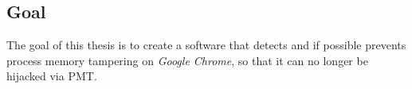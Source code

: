 \subsection{Goal}
The goal of this thesis is to create a software that detects and if possible prevents process memory tampering on \emph{Google Chrome}, so that it can no longer be hijacked via \gls{PMT}.